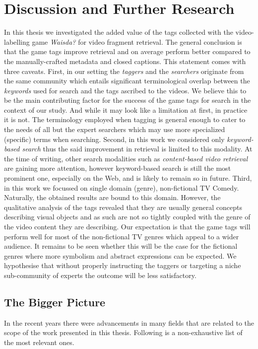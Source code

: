 \section{Discussion and Further Research}
In this thesis we investigated the added value of the tags collected with the video-labelling game \textit{Waisda?} for video fragment retrieval. The general conclusion is that the game tags improve retrieval and on average perform better compared to the manually-crafted metadata and closed captions. This statement comes with three caveats. First, in our setting the \textit{taggers} and the \textit{searchers} originate from the same community which entails significant terminological overlap between the \textit{keywords} used for search and the tags ascribed to the videos. We believe this to be the main contributing factor for the success of the game tags for search in the context of our study. And while it may look like a limitation at first, in practice it is not. The terminology employed when tagging is general enough to cater to the needs of all but the expert searchers which may use more specialized (specific) terms when searching. Second, in this work we considered only \textit{keyword-based search} thus the said improvement in retrieval is limited to this modality. At the time of writing, other search modalities such as \textit{content-based video retrieval} \cite{veltkamp2013state} are gaining more attention, however keyword-based search is still the most prominent one, especially on the Web, and is likely to remain so in future. Third, in this work we focussed on single domain (genre), non-fictional TV Comedy. Naturally, the obtained results are bound to this domain. However, the qualitative analysis of the tags revealed that they are usually general concepts describing visual objects and as such are not so tightly coupled with the genre of the video content they are describing. Our expectation is that the game tags will perform well for most of the non-fictional TV genres which appeal to a wider audience. It remains to be seen whether this will be the case for the fictional genres where more symbolism and abstract expressions can be expected. We hypothesise that without properly instructing the taggers or targeting a niche sub-community of experts the outcome will be less satisfactory.

\subsection{The Bigger Picture}
In the recent years there were advancements in many fields that are related to the scope of the work presented in this thesis. Following is a non-exhaustive list of the most relevant ones.


